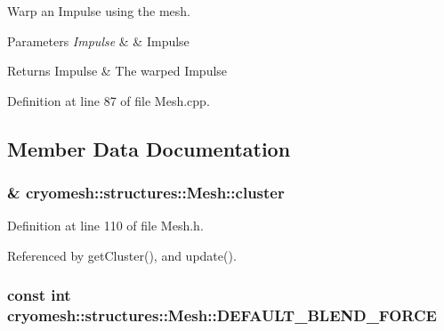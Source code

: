 \-Warp an \-Impulse using the mesh. 


\begin{DoxyParams}{\-Parameters}
{\em \-Impulse} & \& \-Impulse\\
\hline
\end{DoxyParams}
\begin{DoxyReturn}{\-Returns}
\-Impulse \& \-The warped \-Impulse 
\end{DoxyReturn}


\-Definition at line 87 of file \-Mesh.\-cpp.



\subsection{\-Member \-Data \-Documentation}
\hypertarget{classcryomesh_1_1structures_1_1Mesh_abcb6d0f863592f641cb5f8801d268fa2}{
\subsubsection[{cluster}]{\& {\bf cryomesh\-::structures\-::\-Mesh\-::cluster}}}\label{classcryomesh_1_1structures_1_1Mesh_abcb6d0f863592f641cb5f8801d268fa2}


\-Definition at line 110 of file \-Mesh.\-h.



\-Referenced by get\-Cluster(), and update().

\hypertarget{classcryomesh_1_1structures_1_1Mesh_a1f56ed809a278be7c36d96a46e33549a}{
\subsubsection[{\-D\-E\-F\-A\-U\-L\-T\-\_\-\-B\-L\-E\-N\-D\-\_\-\-F\-O\-R\-C\-E}]{\setlength{\rightskip}{0pt plus 5cm}const int {\bf cryomesh\-::structures\-::\-Mesh\-::\-D\-E\-F\-A\-U\-L\-T\-\_\-\-B\-L\-E\-N\-D\-\_\-\-F\-O\-R\-C\-E}}}\label{classcryomesh_1_1structures_1_1Mesh_a1f56ed809a278be7c36d96a46e33549a}


